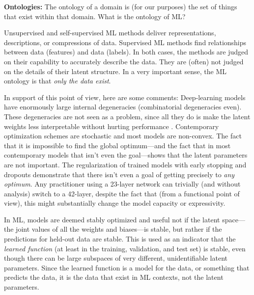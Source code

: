 \documentclass{article}
\renewcommand{\paragraph}[1]{\noindent\par\textbf{#1}}
\begin{document}
\paragraph{Ontologies:}
The ontology of a domain is (for our purposes) the set of things that exist within that domain.
What is the ontology of ML?

Unsupervised and self-supervised ML methods deliver representations, descriptions, or compressions of data.
Supervised ML methods find relationships between data (features) and data (labels).
In both cases, the methods are judged on their capability to accurately describe the data.
They are (often) not judged on the details of their latent structure.
In a very important sense, the ML ontology is that \emph{only the data exist}.

In support of this point of view, here are some comments:
Deep-learning models have enormously large internal degeneracies (combinatorial degeneracies even).
These degeneracies are not seen as a problem, since all they do is make the latent weights less interpretable without hurting performance \cite{belkin2019reconciling, bartlett2020benign}.
Contemporary optimization schemes are stochastic \cite{stochastic, adam} and most models are non-convex.
The fact that it is impossible to find the global optimum---and the fact that in most contemporary models that isn't even the goal---shows that the latent parameters are not important.
The regularization of trained models with early stopping \cite{early_stop} and dropouts \cite{dropout} demonstrate that there isn't even a goal of getting precisely to \emph{any optimum}.
Any practitioner using a 23-layer network can trivially (and without analysis) switch to a 42-layer, despite the fact that (from a functional point of view), this might substantially change the model capacity or expressivity.

In ML, models are deemed stably optimized and useful not if the latent space---the joint values of all the weights and biases---is stable, but rather if the predictions for held-out data are stable.
This is used as an indicator that the \emph{learned function} (at least in the training, validation, and test set) is stable, even though there can be large subspaces of very different, unidentifiable latent parameters.
Since the learned function is a model for the data, or something that predicts the data, it is the data that exist in ML contexts, not the latent parameters.
\end{document}
